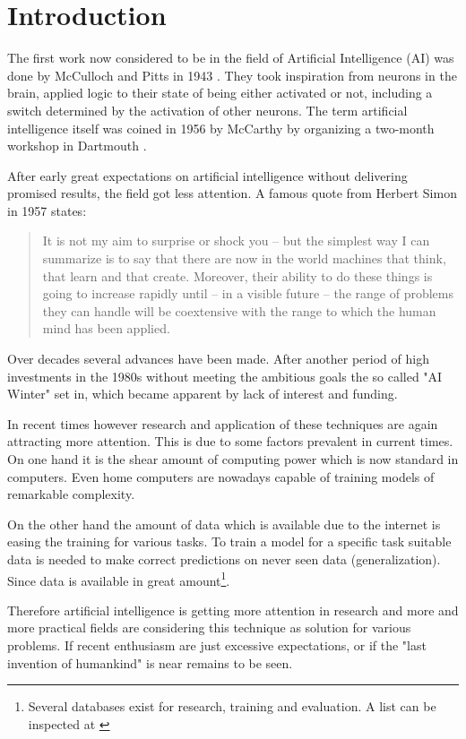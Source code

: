 \section{Introduction}

The first work now considered to be in the field of Artificial Intelligence (AI) was done by McCulloch and Pitts in 1943 \cite{McCulloch1943}.
They took inspiration from neurons in the brain, applied logic to their state of being either activated or not, including a switch determined by the activation of other neurons.
The term artificial intelligence itself was coined in 1956 by McCarthy by organizing a two-month workshop in Dartmouth \cite{McCarthy1955}.

After early great expectations on artificial intelligence without delivering promised results, the field got less attention.
A famous quote from Herbert Simon in 1957 states: 
\begin{quotation}
    It is not my aim to surprise or shock you – but the simplest way I can summarize is to say that there are now in the world machines that think, that learn and that create. Moreover, their ability to do these things is going to increase rapidly until – in a visible future – the range of problems they can handle will be coextensive with the range to which the human mind has been applied.
\end{quotation}

Over decades several advances have been made.
After another period of high investments in the 1980s without meeting the ambitious goals the so called "AI Winter" set in, which became apparent by lack of interest and funding.

In recent times however research and application of these techniques are again attracting more attention.
This is due to some factors prevalent in current times.
On one hand it is the shear amount of computing power which is now standard in computers.
Even home computers are nowadays capable of training models of remarkable complexity.

On the other hand the amount of data which is available due to the internet is easing the training for various tasks.
To train a model for a specific task suitable data is needed to make correct predictions on never seen data (generalization).
Since data is available in great amount\footnote{Several databases exist for research, training and evaluation.
A list can be inspected at \cite{Wikipedia2019}}.

Therefore artificial intelligence is getting more attention in research and more and more practical fields are considering this technique as solution for various problems.
If recent enthusiasm are just excessive expectations, or if the "last invention of humankind" \cite{Good1965} is near remains to be seen.

